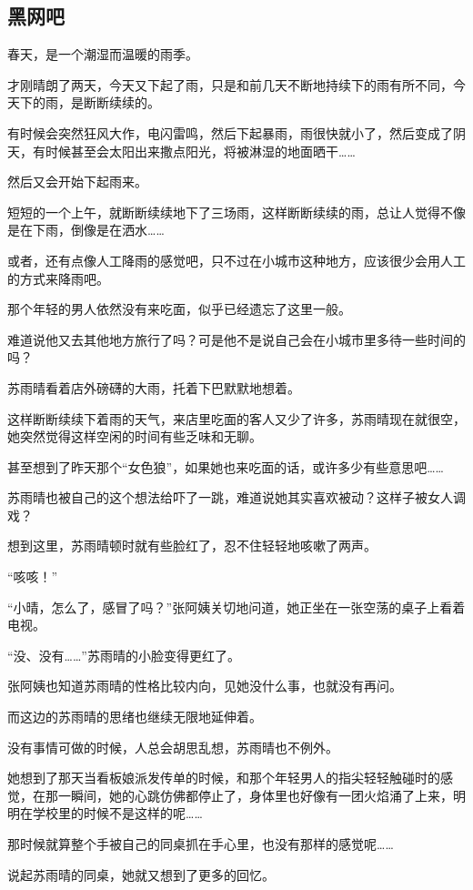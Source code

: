 \subsection{黑网吧}

春天，是一个潮湿而温暖的雨季。

才刚晴朗了两天，今天又下起了雨，只是和前几天不断地持续下的雨有所不同，今天下的雨，是断断续续的。

有时候会突然狂风大作，电闪雷鸣，然后下起暴雨，雨很快就小了，然后变成了阴天，有时候甚至会太阳出来撒点阳光，将被淋湿的地面晒干……

然后又会开始下起雨来。

短短的一个上午，就断断续续地下了三场雨，这样断断续续的雨，总让人觉得不像是在下雨，倒像是在洒水……

或者，还有点像人工降雨的感觉吧，只不过在小城市这种地方，应该很少会用人工的方式来降雨吧。

那个年轻的男人依然没有来吃面，似乎已经遗忘了这里一般。

难道说他又去其他地方旅行了吗？可是他不是说自己会在小城市里多待一些时间的吗？

苏雨晴看着店外磅礴的大雨，托着下巴默默地想着。

这样断断续续下着雨的天气，来店里吃面的客人又少了许多，苏雨晴现在就很空，她突然觉得这样空闲的时间有些乏味和无聊。

甚至想到了昨天那个“女色狼”，如果她也来吃面的话，或许多少有些意思吧……

苏雨晴也被自己的这个想法给吓了一跳，难道说她其实喜欢被动？这样子被女人调戏？

想到这里，苏雨晴顿时就有些脸红了，忍不住轻轻地咳嗽了两声。

“咳咳！”

“小晴，怎么了，感冒了吗？”张阿姨关切地问道，她正坐在一张空荡的桌子上看着电视。

“没、没有……”苏雨晴的小脸变得更红了。

张阿姨也知道苏雨晴的性格比较内向，见她没什么事，也就没有再问。

而这边的苏雨晴的思绪也继续无限地延伸着。

没有事情可做的时候，人总会胡思乱想，苏雨晴也不例外。

她想到了那天当看板娘派发传单的时候，和那个年轻男人的指尖轻轻触碰时的感觉，在那一瞬间，她的心跳仿佛都停止了，身体里也好像有一团火焰涌了上来，明明在学校里的时候不是这样的呢……

那时候就算整个手被自己的同桌抓在手心里，也没有那样的感觉呢……

说起苏雨晴的同桌，她就又想到了更多的回忆。

